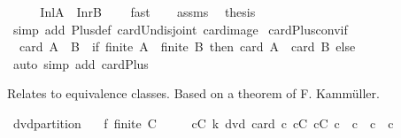 \begin{isabellebody}
%
\isadelimproof
%
\endisadelimproof
%
\isatagproof
{}\isamarkupfalse%
\ {\isacharminus}{\kern0pt}\isanewline
\ \ \isamarkupfalse%
\ {\isachardoublequoteopen}Inl{\isacharbackquote}{\kern0pt}A\ {\isasyminter}\ Inr{\isacharbackquote}{\kern0pt}B\ {\isacharequal}{\kern0pt}\ {\isacharbraceleft}{\kern0pt}{\isacharbraceright}{\kern0pt}{\isachardoublequoteclose}\ \isamarkupfalse%
\ fast\isanewline
\ \ \isamarkupfalse%
\ assms\ \isamarkupfalse%
\ {\isacharquery}{\kern0pt}thesis\isanewline
\ \ \ \ \isamarkupfalse%
\ {\isacharparenleft}{\kern0pt}simp\ add{\isacharcolon}{\kern0pt}\ Plus{\isacharunderscore}{\kern0pt}def\ card{\isacharunderscore}{\kern0pt}Un{\isacharunderscore}{\kern0pt}disjoint\ card{\isacharunderscore}{\kern0pt}image{\isacharparenright}{\kern0pt}\isanewline
{}\isamarkupfalse%
%
\endisatagproof
{\isafoldproof}%
%
\isadelimproof
\isanewline
%
\endisadelimproof
\isanewline
{}\isamarkupfalse%
\ card{\isacharunderscore}{\kern0pt}Plus{\isacharunderscore}{\kern0pt}conv{\isacharunderscore}{\kern0pt}if{\isacharcolon}{\kern0pt}\isanewline
\ \ {\isachardoublequoteopen}card\ {\isacharparenleft}{\kern0pt}A\ {\isacharless}{\kern0pt}{\isacharplus}{\kern0pt}{\isachargreater}{\kern0pt}\ B{\isacharparenright}{\kern0pt}\ {\isacharequal}{\kern0pt}\ {\isacharparenleft}{\kern0pt}if\ finite\ A\ {\isasymand}\ finite\ B\ then\ card\ A\ {\isacharplus}{\kern0pt}\ card\ B\ else\ {}{\isacharparenright}{\kern0pt}{\isachardoublequoteclose}\isanewline
%
\isadelimproof
\ \ %
\endisadelimproof
%
\isatagproof
{}\isamarkupfalse%
\ {\isacharparenleft}{\kern0pt}auto\ simp\ add{\isacharcolon}{\kern0pt}\ card{\isacharunderscore}{\kern0pt}Plus{\isacharparenright}{\kern0pt}%
\endisatagproof
{\isafoldproof}%
%
\isadelimproof
%
\endisadelimproof
%
\begin{isamarkuptext}%
Relates to equivalence classes.  Based on a theorem of F. Kammüller.%
\end{isamarkuptext}\isamarkuptrue%
\isamarkupfalse%
\ dvd{\isacharunderscore}{\kern0pt}partition{\isacharcolon}{\kern0pt}\isanewline
\ \ \ f{\isacharcolon}{\kern0pt}\ {\isachardoublequoteopen}finite\ {\isacharparenleft}{\kern0pt}{\isasymUnion}C{\isacharparenright}{\kern0pt}{\isachardoublequoteclose}\isanewline
\ \ \ \ \ {\isachardoublequoteopen}{\isasymforall}c{\isasymin}C{\isachardot}{\kern0pt}\ k\ dvd\ card\ c{\isachardoublequoteclose}\ {\isachardoublequoteopen}{\isasymforall}c{}{\isasymin}C{\isachardot}{\kern0pt}\ {\isasymforall}c{}{\isasymin}C{\isachardot}{\kern0pt}\ c{}\ {\isasymnoteq}\ c{}\ {\isasymlongrightarrow}\ c{}\ {\isasyminter}\ c{}\ {\isacharequal}{\kern0pt}\ {\isacharbraceleft}{\kern0pt}{\isacharbraceright}{\kern0pt}{\isachardoublequoteclose}\isanewline

\end{isabellebody}
